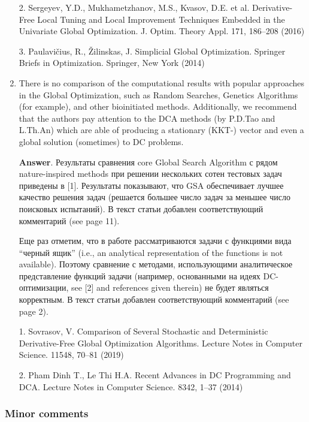 \documentclass{article}%
\begin{document}
\begin{enumerate}
2. Sergeyev, Y.D., Mukhametzhanov, M.S., Kvasov, D.E. et al. Derivative-Free Local Tuning and Local Improvement Techniques Embedded in the Univariate Global Optimization. J. Optim. Theory Appl. 171, 186--208 (2016)

3. Paulavi{\v c}ius, R., {\v Z}ilinskas, J. Simplicial Global Optimization. Springer Briefs in Optimization. Springer, New York (2014)


\item There is no comparison of the computational results with popular approaches in the Global Optimization, such as Random Searches, Genetics Algorithms (for example), and other bioinitiated methods.
Additionally, we recommend that the authors pay attention to the DCA methods (by P.D.Tao and L.Th.An) which are able of producing a stationary (KKT-) vector and even a global solution (sometimes) to DC problems.

\textbf{Answer}.
Результаты сравнения core Global Search Algorithm с рядом nature-inspired methods при решении нескольких сотен тестовых задач приведены в [1]. Результаты показывают, что GSA обеспечивает лучшее качество решения задач (решается большее число задач за меньшее число поисковых испытаний). В текст статьи добавлен соответствующий комментарий (see page 11).

Еще раз отметим, что в работе рассматриваются задачи с функциями вида ``черный ящик'' (i.e., an analytical representation of the functions is not available). Поэтому сравнение с методами, использующими аналитическое представление функций задачи (например, основанными на идеях DC-оптимизации, see [2] and references given therein) не будет являться корректным. В текст статьи добавлен соответствующий комментарий (see page 2).

1. Sovrasov, V.  Comparison of Several Stochastic and Deterministic Derivative-Free Global Optimization Algorithms.  Lecture Notes in Computer Science. 11548, 70--81 (2019)

2. Pham Dinh T., Le Thi H.A. Recent Advances in DC Programming and DCA. Lecture Notes in Computer Science. 8342, 1--37 (2014)

\end{enumerate}


\subsubsection*{Minor comments}
\end{document}
